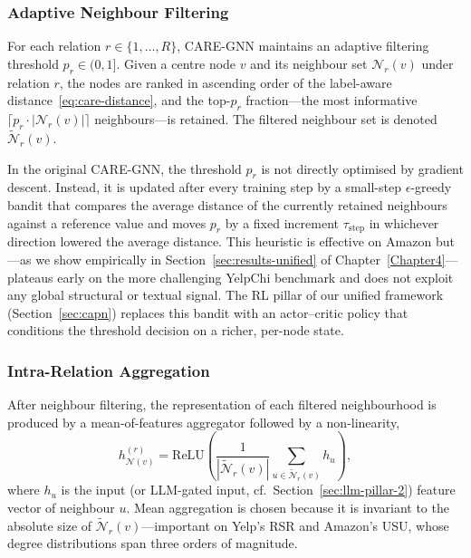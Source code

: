 \subsubsection{Adaptive Neighbour Filtering}
\label{sec:care-filtering}

For each relation $r \in \{1, \dots, R\}$, CARE-GNN maintains an adaptive filtering threshold $p_r \in (0, 1]$. Given a centre node $v$ and its neighbour set $\mathcal{N}_r(v)$ under relation $r$, the nodes are ranked in ascending order of the label-aware distance~\eqref{eq:care-distance}, and the top-$p_r$ fraction---the most informative $\lceil p_r \cdot |\mathcal{N}_r(v)| \rceil$ neighbours---is retained. The filtered neighbour set is denoted $\tilde{\mathcal{N}}_r(v)$.

In the original CARE-GNN, the threshold $p_r$ is not directly optimised by gradient descent. Instead, it is updated after every training step by a small-step $\epsilon$-greedy bandit that compares the average distance of the currently retained neighbours against a reference value and moves $p_r$ by a fixed increment $\tau_{\text{step}}$ in whichever direction lowered the average distance. This heuristic is effective on Amazon but---as we show empirically in Section~\ref{sec:results-unified} of Chapter~\ref{Chapter4}---plateaus early on the more challenging YelpChi benchmark and does not exploit any global structural or textual signal. The RL pillar of our unified framework (Section~\ref{sec:capn}) replaces this bandit with an actor--critic policy that conditions the threshold decision on a richer, per-node state.

\subsubsection{Intra-Relation Aggregation}
\label{sec:care-intra}

After neighbour filtering, the representation of each filtered neighbourhood is produced by a mean-of-features aggregator followed by a non-linearity,
\begin{equation}
h^{(r)}_{\mathcal{N}(v)} = \mathrm{ReLU}\!\left( \frac{1}{|\tilde{\mathcal{N}}_r(v)|} \sum_{u \in \tilde{\mathcal{N}}_r(v)} h_u \right),
\end{equation}
where $h_u$ is the input (or LLM-gated input, cf.\ Section~\ref{sec:llm-pillar-2}) feature vector of neighbour $u$. Mean aggregation is chosen because it is invariant to the absolute size of $\tilde{\mathcal{N}}_r(v)$---important on Yelp's RSR and Amazon's USU, whose degree distributions span three orders of magnitude.

